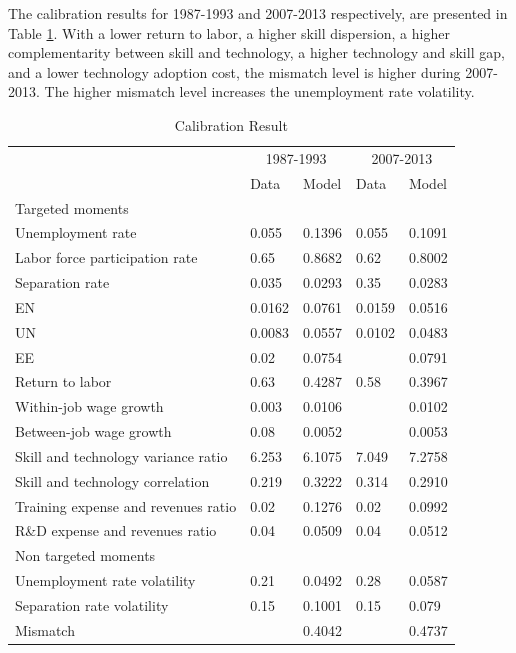 \documentclass[12pt]{article}
\newcommand{\1}{\mathbb{1}}
\begin{document}
The calibration results for 1987-1993 and 2007-2013 respectively, are presented in Table \ref{Calibration_Result}. With a lower return to labor, a higher skill dispersion, a higher complementarity between skill and technology, a higher technology and skill gap, and a lower technology adoption cost, the mismatch level is higher during 2007-2013. The higher mismatch level increases the unemployment rate volatility. 
 
\begin{table}[h!]
\scriptsize
\begin{center}
\begin{tabular}{l|llll}
\hline \hline
           & \multicolumn{2}{c}{1987-1993}     & \multicolumn{2}{c}{2007-2013}                \\ 
            & Data     &  Model   & Data     &  Model     \\ \hline
Targeted moments  \\
Unemployment rate          & 0.055 & 0.1396 & 0.055 & 0.1091 \\
Labor force participation rate            & 0.65  & 0.8682 & 0.62  & 0.8002 \\
Separation rate          & 0.035  & 0.0293 & 0.35  & 0.0283 \\
EN       & 0.0162  & 0.0761 & 0.0159  & 0.0516 \\
UN      & 0.0083  &  0.0557 & 0.0102  & 0.0483 \\
EE       & 0.02  & 0.0754&   & 0.0791 \\
Return to labor        & 0.63  & 0.4287 & 0.58  & 0.3967 \\
Within-job wage growth      & 0.003 & 0.0106 &   & 0.0102 \\
Between-job wage growth    & 0.08  & 0.0052     &   & 0.0053     \\
Skill and technology variance ratio          & 6.253   & 6.1075 & 7.049  & 7.2758 \\
Skill and technology correlation        & 0.219 & 0.3222 & 0.314 & 0.2910  \\
Training expense and revenues ratio & 0.02  & 0.1276   & 0.02 & 0.0992  \\
R\&D expense and revenues ratio  & 0.04 & 0.0509  & 0.04  & 0.0512 \\
\hline
Non targeted moments                  \\
Unemployment rate volatility          & 0.21  & 0.0492  & 0.28  & 0.0587 \\
Separation rate volatility           & 0.15  & 0.1001 & 0.15  & 0.079 \\
Mismatch && 0.4042 && 0.4737 \\
\hline 
\end{tabular}
\end{center}
\caption{Calibration Result}
\label{Calibration_Result}
\end{table}
\end{document}
